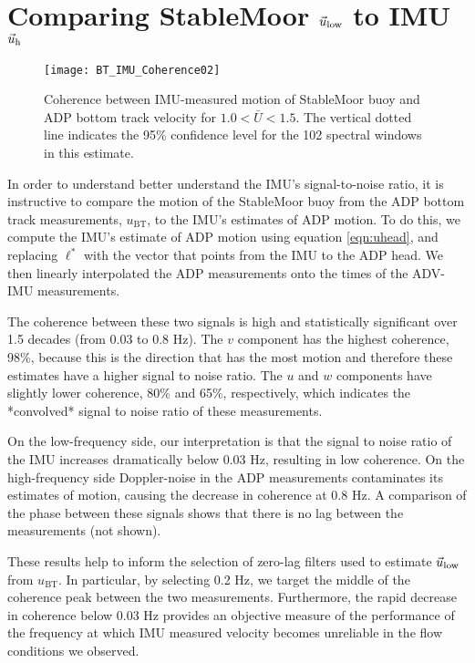 \section{Comparing StableMoor $\vec{u}_\mathrm{low}$ to IMU $\vec{u}_\mathrm{h}$}
\label{apdx:ulow}

\def\ubt{\ensuremath{u_\mathrm{BT}}}

\begin{figure}[t]
  \centering
  \texttt{[image: BT\_IMU\_Coherence02]}
  \caption{Coherence between IMU-measured motion of StableMoor buoy and ADP bottom track velocity for $1.0<\bar{U}<1.5$. The vertical dotted line indicates the 95\% confidence level for the 102 spectral windows in this estimate.}
  \label{fig:SM_coh}
\end{figure}

In order to understand better understand the IMU's signal-to-noise ratio, it is instructive to compare the motion of the StableMoor buoy from the ADP bottom track measurements, $\ubt$, to the IMU's estimates of ADP motion. To do this, we compute the IMU's estimate of ADP motion using equation \eqref{eqn:uhead}, and replacing $\ell^{*}$ with the vector that points from the IMU to the ADP head. We then linearly interpolated the ADP measurements onto the times of the ADV-IMU measurements.

The coherence between these two signals is high and statistically significant over 1.5 decades (from 0.03 to 0.8 Hz). The $v$ component has the highest coherence, 98\%, because this is the direction that has the most motion and therefore these estimates have a higher signal to noise ratio.  The $u$ and $w$ components have slightly lower coherence, 80\% and 65\%, respectively, which indicates the *convolved* signal to noise ratio of these measurements.

On the low-frequency side, our interpretation is that the signal to noise ratio of the IMU increases dramatically below 0.03 Hz, resulting in low coherence. On the high-frequency side Doppler-noise in the ADP measurements contaminates its estimates of motion, causing the decrease in coherence at 0.8 Hz. A comparison of the phase between these signals shows that there is no lag between the measurements (not shown).

These results help to inform the selection of zero-lag filters used to estimate $\vec{u}_\mathrm{low}$ from $\ubt$. In particular, by selecting 0.2 Hz, we target the middle of the coherence peak between the two measurements. Furthermore, the rapid decrease in coherence below 0.03 Hz provides an objective measure of the performance of the frequency at which IMU measured velocity becomes unreliable in the flow conditions we observed. 



